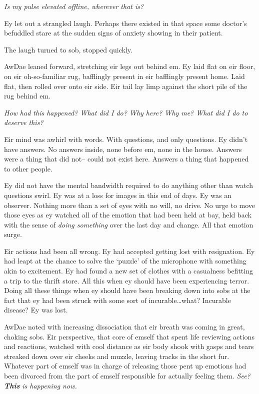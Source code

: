 \emph{Is my pulse elevated offline, wherever that is?}

Ey let out a strangled laugh. Perhaps there existed in that space some doctor's befuddled stare at the sudden signs of anxiety showing in their patient.

The laugh turned to sob, stopped quickly.

AwDae leaned forward, stretching eir legs out behind em. Ey laid flat on eir floor, on eir oh-so-familiar rug, bafflingly present in eir bafflingly present home. Laid flat, then rolled over onto eir side. Eir tail lay limp against the short pile of the rug behind em.

\emph{How had this happened? What did I do? Why here? Why me? What did I do to deserve this?}

Eir mind was awhirl with words. With questions, and only questions. Ey didn't have answers. No answers inside, none before em, none in the house. Answers were a thing that did not-- could not exist here. Answers a thing that happened to other people.

Ey did not have the mental bandwidth required to do anything other than watch questions swirl. Ey was at a loss for images in this end of days. Ey was an observer. Nothing more than a set of eyes with no will, no drive. No urge to move those eyes as ey watched all of the emotion that had been held at bay, held back with the sense of \emph{doing something} over the last day and change. All that emotion surge.

Eir actions had been all wrong. Ey had accepted getting lost with resignation. Ey had leapt at the chance to solve the `puzzle' of the microphone with something akin to excitement. Ey had found a new set of clothes with a casualness befitting a trip to the thrift store. All this when ey should have been experiencing terror. Doing all these things when ey should have been breaking down into sobs at the fact that ey had been struck with some sort of incurable\ldots{}what? Incurable disease? Ey was lost.

AwDae noted with increasing dissociation that eir breath was coming in great, choking sobs. Eir perspective, that core of emself that spent life reviewing actions and reactions, watched with cool distance as eir body shook with gasps and tears streaked down over eir cheeks and muzzle, leaving tracks in the short fur. Whatever part of emself was in charge of releasing those pent up emotions had been divorced from the part of emself responsible for actually feeling them. \emph{See? \textbf{This} is happening now.}

